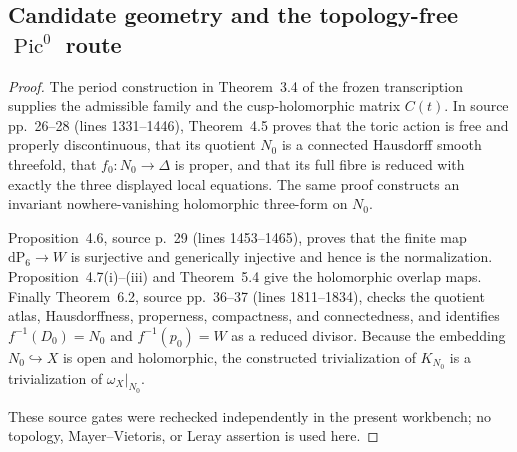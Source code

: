 \subsection{Candidate geometry and the topology-free
\texorpdfstring{$\operatorname{Pic}^0$}{Pic0} route}


\begin{proof}
The period construction in Theorem~3.4 of the frozen transcription supplies
the admissible family and the cusp-holomorphic matrix $C(t)$.  In source
pp.~26--28 (lines 1331--1446), Theorem~4.5 proves that the toric action is
free and properly discontinuous, that its quotient $N_0$ is a connected
Hausdorff smooth threefold, that $f_0:N_0\to\Delta$ is proper, and that its
full fibre is reduced with exactly the three displayed local equations.  The
same proof constructs an invariant nowhere-vanishing holomorphic three-form
on $N_0$.

Proposition~4.6, source p.~29 (lines 1453--1465), proves that the finite map
$\mathrm{dP}_6\to W$ is surjective and generically injective and hence is
the normalization.  Proposition~4.7(i)--(iii) and Theorem~5.4 give the
holomorphic overlap maps.  Finally Theorem~6.2, source pp.~36--37
(lines 1811--1834), checks the quotient atlas, Hausdorffness, properness,
compactness, and connectedness, and identifies
$f^{-1}(D_0)=N_0$ and $f^{-1}(p_0)=W$ as a reduced divisor.  Because the
embedding $N_0\hookrightarrow X$ is open and holomorphic, the constructed
trivialization of $K_{N_0}$ is a trivialization of $\omega_X|_{N_0}$.

These source gates were rechecked independently in the present workbench;
no topology, Mayer--Vietoris, or Leray assertion is used here.
\end{proof}

